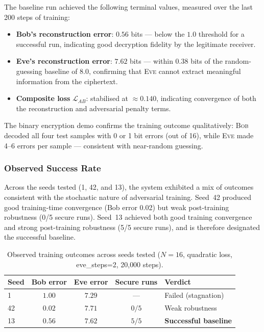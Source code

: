 \documentclass[12pt, a4paper]{article}
\newcommand{\bob}{\textsc{Bob}}
\newcommand{\eve}{\textsc{Eve}}
\begin{document}
The baseline run achieved the following terminal values, measured over
the last 200 steps of training:

\begin{itemize}[leftmargin=1.8em, itemsep=4pt]
  \item \textbf{Bob's reconstruction error}: $\mathbf{0.56}$ bits ---
        below the $1.0$ threshold for a successful run, indicating
        good decryption fidelity by the legitimate receiver.
  \item \textbf{Eve's reconstruction error}: $\mathbf{7.62}$ bits ---
        within $0.38$ bits of the random-guessing baseline of $8.0$,
        confirming that \eve{} cannot extract meaningful information from
        the ciphertext.
  \item \textbf{Composite loss} $\mathcal{L}_{AB}$: stabilised at
        $\approx 0.140$, indicating convergence of both the reconstruction
        and adversarial penalty terms.
\end{itemize}

The binary encryption demo confirms the training outcome qualitatively:
\bob{} decoded all four test samples with 0 or 1 bit errors (out of 16),
while \eve{} made 4--6 errors per sample --- consistent with near-random
guessing.

\subsubsection*{Observed Success Rate}

Across the seeds tested (1, 42, and 13), the system exhibited a mix of
outcomes consistent with the stochastic nature of adversarial training.
Seed~42 produced good training-time convergence (Bob error 0.02) but
weak post-training robustness (0/5 secure runs). Seed~13 achieved both
good training convergence and strong post-training robustness (5/5 secure
runs), and is therefore designated the successful baseline.

\begin{table}[H]
  \centering
  \caption{Observed training outcomes across seeds tested
           ($N=16$, quadratic loss, eve\_steps=2, 20{,}000 steps).}
  \label{tab:baseline_outcomes}
  \renewcommand{\arraystretch}{1.35}
  \begin{tabularx}{\linewidth}{@{} l c c c X @{}}
    \toprule
    \textbf{Seed} & \textbf{Bob error} & \textbf{Eve error} &
    \textbf{Secure runs} & \textbf{Verdict} \\
    \midrule
    1  & $1.00$ & $7.29$ & ---   & Failed (stagnation) \\
    42 & $0.02$ & $7.71$ & $0/5$ & Weak robustness \\
    13 & $0.56$ & $7.62$ & $5/5$ & \textbf{Successful baseline} \\
    \bottomrule
  \end{tabularx}
\end{table}
\end{document}
